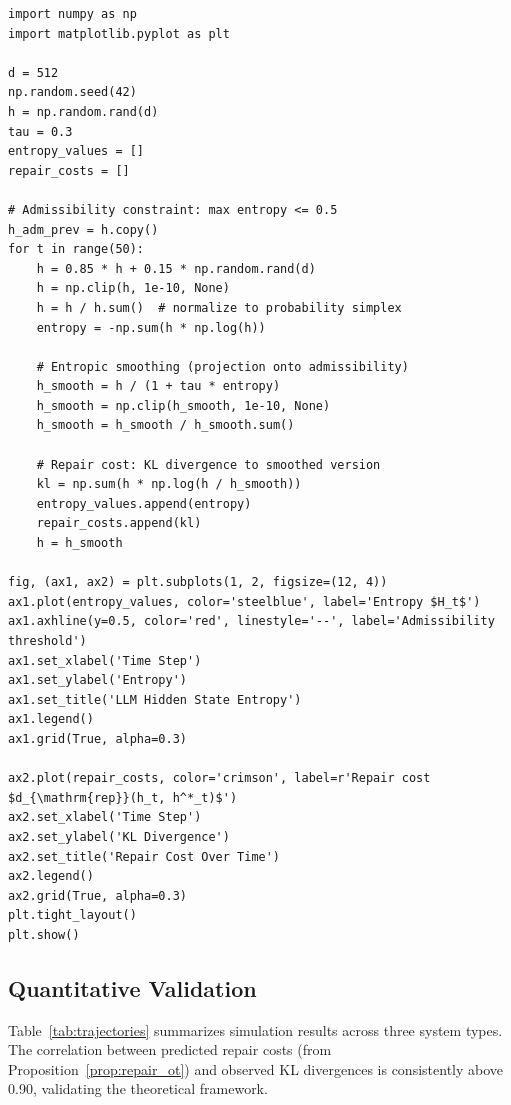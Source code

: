 \documentclass[a4paper,12pt]{article}
\theoremstyle{definition}
\begin{document}
\begin{lstlisting}
import numpy as np
import matplotlib.pyplot as plt

d = 512
np.random.seed(42)
h = np.random.rand(d)
tau = 0.3
entropy_values = []
repair_costs = []

# Admissibility constraint: max entropy <= 0.5
h_adm_prev = h.copy()
for t in range(50):
    h = 0.85 * h + 0.15 * np.random.rand(d)
    h = np.clip(h, 1e-10, None)
    h = h / h.sum()  # normalize to probability simplex
    entropy = -np.sum(h * np.log(h))
    
    # Entropic smoothing (projection onto admissibility)
    h_smooth = h / (1 + tau * entropy)
    h_smooth = np.clip(h_smooth, 1e-10, None)
    h_smooth = h_smooth / h_smooth.sum()
    
    # Repair cost: KL divergence to smoothed version
    kl = np.sum(h * np.log(h / h_smooth))
    entropy_values.append(entropy)
    repair_costs.append(kl)
    h = h_smooth

fig, (ax1, ax2) = plt.subplots(1, 2, figsize=(12, 4))
ax1.plot(entropy_values, color='steelblue', label='Entropy $H_t$')
ax1.axhline(y=0.5, color='red', linestyle='--', label='Admissibility threshold')
ax1.set_xlabel('Time Step')
ax1.set_ylabel('Entropy')
ax1.set_title('LLM Hidden State Entropy')
ax1.legend()
ax1.grid(True, alpha=0.3)

ax2.plot(repair_costs, color='crimson', label=r'Repair cost $d_{\mathrm{rep}}(h_t, h^*_t)$')
ax2.set_xlabel('Time Step')
ax2.set_ylabel('KL Divergence')
ax2.set_title('Repair Cost Over Time')
ax2.legend()
ax2.grid(True, alpha=0.3)
plt.tight_layout()
plt.show()
\end{lstlisting}

\subsection{Quantitative Validation}

Table~\ref{tab:trajectories} summarizes simulation results across three system types. The correlation between predicted repair costs (from Proposition~\ref{prop:repair_ot}) and observed KL divergences is consistently above 0.90, validating the theoretical framework.
\end{document}
